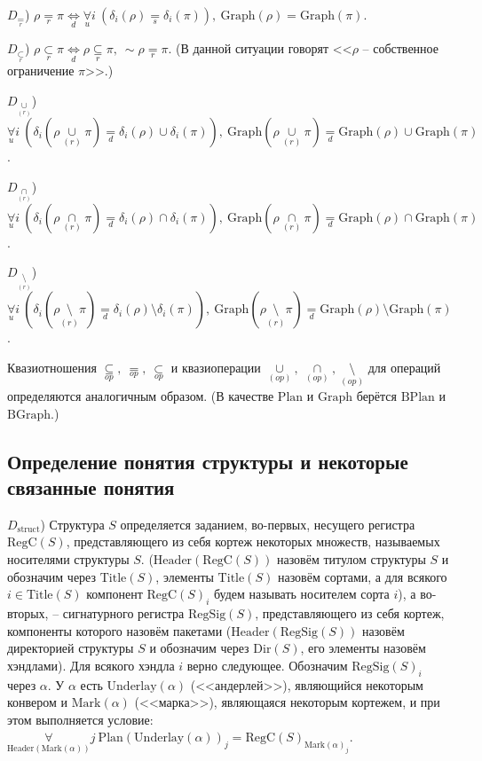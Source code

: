 \documentclass[a4paper]{article}
\newcommand{\Def}[0]{\underset{d}{\Leftrightarrow}}
\newcommand{\defeq}[0]{\underset{d}{=}}
\newcommand{\eqs}[0]{\underset{s}{=}} %
\newcommand{\eqr}[0]{\underset{r}{=}} %
\newcommand{\subseteqr}[0]{\underset{r}{\subseteq}} %
\newcommand{\subsetr}[0]{\underset{r}{\subset}} %
\newcommand{\cupr}[0]{\underset{(r)}{\cup}} %
\newcommand{\capr}[0]{\underset{(r)}{\cap}} %
\newcommand{\setminusr}[0]{\underset{(r)}{\setminus}} %
\newcommand{\subseteqop}[0]{\underset{op}{\subseteq}}
\newcommand{\subsetop}[0]{\underset{op}{\subset}}
\newcommand{\eqop}[0]{\underset{op}{=}}
\newcommand{\cupop}[0]{\underset{(op)}{\cup}}
\newcommand{\capop}[0]{\underset{(op)}{\cap}}
\newcommand{\setminusop}[0]{\underset{(op)}{\setminus}}
\newcommand{\Header}[1]{\mathrm{Header}(#1)}
\newcommand{\Plan}[1]{\mathrm{Plan}(#1)}
\newcommand{\Graph}[1]{\mathrm{Graph}(#1)}
\newcommand{\Title}[1]{\mathrm{Title}(#1)}
\newcommand{\Dir}[1]{\mathrm{Dir}(#1)}
\newcommand{\RegSig}[1]{\mathrm{RegSig}(#1)}
\newcommand{\RegC}[1]{\mathrm{RegC}(#1)}
\newcommand{\Mark}[1]{\mathrm{Mark}(#1)}
\newcommand{\Underlay}[1]{\mathrm{Underlay}(#1)}
\begin{document}
$D_{\eqr}$) $\rho \eqr \pi \Def \underset{u}{\forall} i~ (\delta_i(\rho) \eqs \delta_i(\pi)),~ \Graph{\rho} = \Graph{\pi}$.

$D_{\subsetr}$) $\rho \subsetr \pi \Def \rho \subseteqr \pi,~ \sim \rho \eqr \pi$. (В данной ситуации говорят <<$\rho$ -- собственное ограничение $\pi$>>.)

$D_{\cupr}$) $\underset{u}{\forall} i~ (\delta_i(\rho \cupr \pi) \defeq \delta_i(\rho) \cup \delta_i(\pi)),~ \Graph{\rho \cupr \pi} \defeq \Graph{\rho} \cup \Graph{\pi}$.

$D_{\capr}$) $\underset{u}{\forall} i~ (\delta_i(\rho \capr \pi) \defeq \delta_i(\rho) \cap \delta_i(\pi)),~ \Graph{\rho \capr \pi} \defeq \Graph{\rho} \cap \Graph{\pi}$.

$D_{\setminusr}$) $\underset{u}{\forall} i~ (\delta_i(\rho \setminusr \pi) \defeq \delta_i(\rho) \setminus \delta_i(\pi)),~ \Graph{\rho \setminusr \pi} \defeq \Graph{\rho} \setminus \Graph{\pi}$.

Квазиотношения $\subseteqop,~ \eqop,~ \subsetop$ и квазиоперации $\cupop,~ \capop,~ \setminusop$ для операций определяются аналогичным образом. (В качестве $\mathrm{Plan}$ и $\mathrm{Graph}$ берётся $\mathrm{BPlan}$ и $\mathrm{BGraph}$.)

\subsection{Определение понятия структуры и некоторые связанные понятия}

$D_\text{struct}$) Структура $S$ определяется заданием, во-первых, несущего регистра $\RegC{S}$, представляющего из себя кортеж некоторых множеств, называемых носителями структуры $S$. ($\Header{\RegC{S}}$ назовём титулом структуры $S$ и обозначим через $\Title{S}$, элементы $\Title{S}$ назовём сортами, а для всякого $i \in \Title{S}$ компонент $\RegC{S}_i$ будем называть носителем сорта $i$), а во-вторых, -- сигнатурного регистра $\RegSig{S}$, представляющего из себя кортеж, компоненты которого назовём пакетами ($\Header{\RegSig{S}}$ назовём директорией структуры $S$ и обозначим через $\Dir{S}$, его элементы назовём хэндлами). Для всякого хэндла $i$ верно следующее. Обозначим $\RegSig{S}_i$ через $\alpha$. У $\alpha$ есть $\Underlay{\alpha}$ (<<андерлей>>), являющийся некоторым конвером и $\Mark{\alpha}$ (<<марка>>), являющаяся некоторым кортежем, и при этом выполняется условие: $\underset{\Header{\Mark{\alpha}}}{\forall} j~ \Plan{\Underlay{\alpha}}_j = \RegC{S}_{\Mark{\alpha}_j}$.
\end{document}
